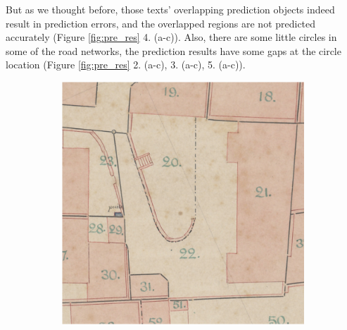 \documentclass[12pt]{article}
\begin{document}
But as we thought before, those texts' overlapping prediction objects indeed result in prediction errors, and the overlapped regions are not predicted accurately (Figure \ref{fig:pre_res} 4. (a-c)). Also, there are some little circles in some of the road networks, the prediction results have some gaps at the circle location (Figure \ref{fig:pre_res} 2. (a-c), 3. (a-c), 5. (a-c)).

\begin{figure}[H]
    \centering
    \begin{subfigure}[b]{.28\textwidth}
		\begin{minipage}[t]{1\linewidth}
			\centering
			\includegraphics[width=1\linewidth]{images/patches/img3.png}
		\end{minipage}
	\end{subfigure}
	\begin{subfigure}[b]{.28\textwidth}
		\begin{minipage}[t]{1\linewidth}
			\centering

\end{minipage}
\end{subfigure}
\end{figure}
\end{document}
